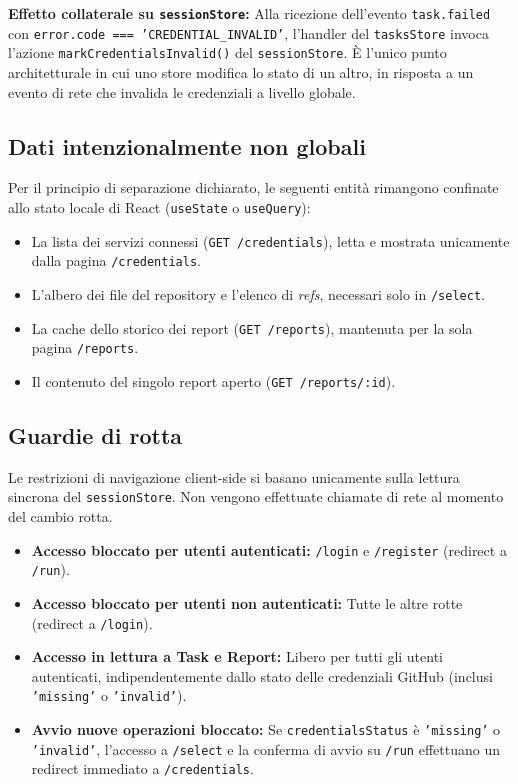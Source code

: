 \documentclass[11pt,a4paper]{article}
\begin{document}
\textbf{Effetto collaterale su \texttt{session\allowbreak{}Store}:} Alla ricezione dell'evento \texttt{task.failed} con \texttt{error.code === 'CREDENTIAL\_\allowbreak{}INVALID'}, l'handler del \texttt{tasks\allowbreak{}Store} invoca l'azione \texttt{mark\allowbreak{}Credentials\allowbreak{}Invalid()} del \texttt{session\allowbreak{}Store}. È l'unico punto architetturale in cui uno store modifica lo stato di un altro, in risposta a un evento di rete che invalida le credenziali a livello globale.

\subsection{Dati intenzionalmente non globali}

Per il principio di separazione dichiarato, le seguenti entità rimangono confinate allo stato locale di React (\texttt{useState} o \texttt{useQuery}):

\begin{itemize}
    \item La lista dei servizi connessi (\texttt{GET /credentials}), letta e mostrata unicamente dalla pagina \texttt{/credentials}.
    \item L'albero dei file del repository e l'elenco di \emph{refs}, necessari solo in \texttt{/select}.
    \item La cache dello storico dei report (\texttt{GET /reports}), mantenuta per la sola pagina \texttt{/reports}.
    \item Il contenuto del singolo report aperto (\texttt{GET /reports/:id}).
\end{itemize}

\subsection{Guardie di rotta}
\label{sec:fe-guardie}

Le restrizioni di navigazione client-side si basano unicamente sulla lettura sincrona del \texttt{sessionStore}. Non vengono effettuate chiamate di rete al momento del cambio rotta.

\begin{itemize}
    \item \textbf{Accesso bloccato per utenti autenticati:} \texttt{/login} e \texttt{/register} (redirect a \texttt{/run}).
    \item \textbf{Accesso bloccato per utenti non autenticati:} Tutte le altre rotte (redirect a \texttt{/login}).
    \item \textbf{Accesso in lettura a Task e Report:} Libero per tutti gli utenti autenticati, indipendentemente dallo stato delle credenziali GitHub (inclusi \texttt{'missing'} o \texttt{'invalid'}).
    \item \textbf{Avvio nuove operazioni bloccato:} Se \texttt{credentialsStatus} è \texttt{'missing'} o \texttt{'invalid'}, l'accesso a \texttt{/select} e la conferma di avvio su \texttt{/run} effettuano un redirect immediato a \texttt{/credentials}.
\end{itemize}
\end{document}
